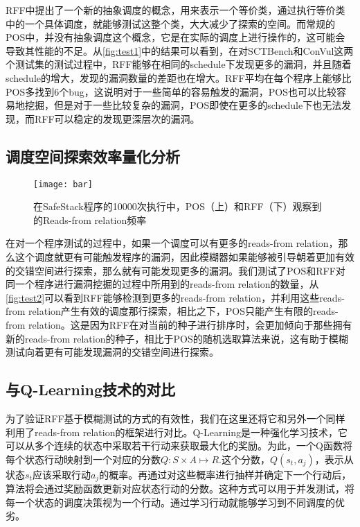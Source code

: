 RFF中提出了一个新的抽象调度的概念，用来表示一个等价类，通过执行等价类中的一个具体调度，就能够测试这整个类，大大减少了探索的空间。而常规的POS中，并没有抽象调度这个概念，它是在实际的调度上进行操作的，这可能会导致其性能的不足。从\autoref{fig:test1}中的结果可以看到，在对SCTBench和ConVul这两个测试集的测试过程中，RFF能够在相同的schedule下发现更多的漏洞，并且随着schedule的增大，发现的漏洞数量的差距也在增大。RFF平均在每个程序上能够比POS多找到6个bug，这说明对于一些简单的容易触发的漏洞，POS也可以比较容易地挖掘，但是对于一些比较复杂的漏洞，POS即使在更多的schedule下也无法发现，而RFF可以稳定的发现更深层次的漏洞。

\subsection{调度空间探索效率量化分析}

\begin{figure}[ht]
    \centering
    \texttt{[image: bar]}
    \caption{\label{fig:test2}在SafeStack程序的10000次执行中，POS（上）和RFF（下）观察到的Reads-from relation频率}
\end{figure}

在对一个程序测试的过程中，如果一个调度可以有更多的reads-from relation，那么这个调度就更有可能触发程序的漏洞，因此模糊器如果能够被引导朝着更加有效的交错空间进行探索，那么就有可能发现更多的漏洞。我们测试了POS和RFF对同一个程序进行漏洞挖掘的过程中所用到的reads-from relation的数量，从\autoref{fig:test2}可以看到RFF能够检测到更多的reads-from relation，并利用这些reads-from relation产生有效的调度那行探索，相比之下，POS只能产生有限的reads-from relation。这是因为RFF在对当前的种子进行排序时，会更加倾向于那些拥有新的reads-from relation的种子，相比于POS的随机选取算法来说，这有助于模糊测试向着更有可能发现漏洞的交错空间进行探索。

\subsection{与Q-Learning技术的对比}
为了验证RFF基于模糊测试的方式的有效性，我们在这里还将它和另外一个同样利用了reads-from relation的框架进行对比。Q-Learning是一种强化学习技术，它可以从多个连续的状态中采取若干行动来获取最大化的奖励。为此，一个Q函数将每个状态行动映射到一个对应的分数$Q:S\times A \mapsto R$.这个分数，$Q(s_t, a_j)$，表示从状态$s_t$应该采取行动$a_j$的概率。再通过对这些概率进行抽样并确定下一个行动后，算法将会通过奖励函数更新对应状态行动的分数。这种方式可以用于并发测试，将每一个状态的调度决策视为一个行动。通过学习行动就能够学习到不同调度的优劣。

